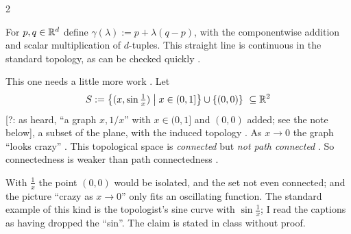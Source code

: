 \begin{paracol}{2}
\begin{example}\label{ex:iv-Rd-path}
For $p,q\in\mathbb{R}^d$ define $\gamma(\lambda):=p+\lambda(q-p)$, with the componentwise addition and scalar multiplication of $d$-tuples. This straight line is continuous in the standard topology, as can be checked quickly
.
\end{example}

\begin{example}\label{ex:iv-sine}
This one needs a little more work . Let
\[
  S:=\bigl\{(x,\sin\tfrac1x)\bigm|x\in(0,1]\bigr\}\cup\{(0,0)\}\ \subseteq\R^2
\]
[?: as heard, ``a graph $x,1/x$'' with $x\in(0,1]$ and $(0,0)$ added; see the note below], a subset of the plane, with the induced topology
. As $x\to0$ the graph ``looks crazy'' . This topological space is \emph{connected} but \emph{not path connected}
. So connectedness is weaker than path connectedness .
\end{example}
\begin{coursenote}
With $\frac1x$ the point $(0,0)$ would be isolated, and the set not even connected; and the picture ``crazy as $x\to0$'' only fits an oscillating function. The standard example of this kind is the
topologist's sine curve with $\sin\frac1x$; I read the captions as having dropped the ``sin''. The claim is stated in class without proof.
\end{coursenote}


\end{paracol}
